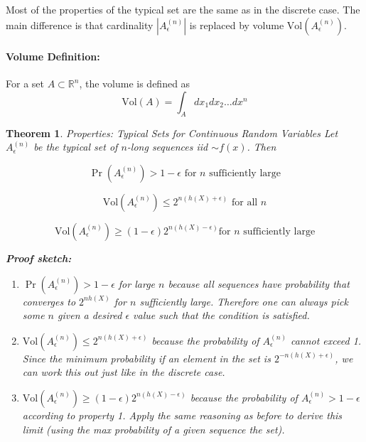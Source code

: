 \documentclass[a4paper,12pt]{report}
\newtheorem{theorem}{Theorem}
\begin{document}
Most of the properties of the typical set are the same as in the discrete case.
The main difference is that cardinality $\left| A_\epsilon^{(n)} \right|$ is
replaced by volume $\text{Vol} \left( A_\epsilon ^{(n)} \right)$.

\paragraph{Volume Definition: } For a set $A \subset \mathbb R^n$, the volume is
defined as 
\begin{equation}
	\text{Vol}(A) = \int_A dx_1 dx_2 \dots dx^n
\end{equation}




\begin{theorem}{Properties: Typical Sets for Continuous Random Variables}
Let $A_\epsilon^{(n)}$ be the typical set of $n$-long sequences iid $\sim f(x)$.
Then 

\begin{equation}
	\label{eqn:cts_typical_prob}
	\Pr(A_\epsilon^{(n)}) > 1-\epsilon \text{ for $n$ sufficiently large} 
\end{equation}

\begin{equation}
	\label{eqn:typical_volume_lower_bound}
	\text{Vol}(A_\epsilon^{(n)}) \leq 2^{n(h(X) + \epsilon)} \text{ for all $n$}
\end{equation}

\begin{equation}
	\label{eqn:typical_volume_upper_bound}
	\text{Vol}(A_\epsilon^{(n)}) \geq (1-\epsilon) 2^{n(h(X) - \epsilon)} \text{
	for $n$ sufficiently large}
\end{equation}

\textbf{Proof sketch:} 
\begin{enumerate}
\item $\Pr(A_\epsilon^{(n)}) > 1-\epsilon$ for large $n$ because all sequences
have probability that converges to $2^{nh(X)}$ for $n$ sufficiently large.
Therefore one can always pick some $n$ given a desired $\epsilon$ value such
that the condition is satisfied. 
\item $\text{Vol}(A_\epsilon^{(n)}) \leq 2^{n(h(X) + \epsilon)}$ because the
probability of $A_\epsilon^{(n)}$ cannot exceed 1. Since the minimum probability
if an element in the set is $2^{-n(h(X) + \epsilon)}$, we can work this out just
like in the discrete case. 
\item $\text{Vol}(A_\epsilon^{(n)}) \geq (1-\epsilon)2^{n(h(X) - \epsilon)}$
because the probability of $A_\epsilon^{(n)} > 1-\epsilon$ according to property
1. Apply the same reasoning as before to derive this limit (using the max
probability of a given sequence the set).
\end{enumerate}
\end{theorem}
\end{document}
